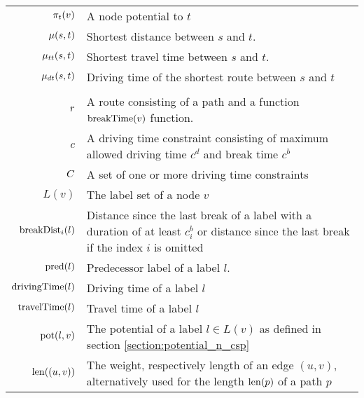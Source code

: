 \begin{tabular}{rp{}}
	$\pi_t(v)$         & A node potential to $t$                                                                                                                   \\
	$\mu(s,t)$          & Shortest distance between $s$ and $t$.                                                                                                    \\
	$\mu_{tt}(s,t)$        & Shortest travel time between $s$ and $t$.                                                                                                 \\
	$\mu_{dt}(s,t)$       & Driving time of the shortest route between $s$ and $t$                                                                                    \\
	\\
	$r$                  & A route consisting of a path and a function $\operatorname{breakTime}(v)$ function.                                                                     \\
	$c$                  & A driving time constraint consisting of maximum allowed driving time $c^d$ and break time $c^b$                                           \\
	$C$               & A set of one or more driving time constraints                                                                                             \\
	$L(v)$                    & The label set of a node $v$                                                                                                               \\
	$\operatorname{breakDist}_i(l)$         & Distance since the last break of a label with a duration of at least $c_i^b$ or distance since the last break if the index $i$ is omitted \\
	$\operatorname{pred}(l)$                & Predecessor label of a label $l$.                                                                                                         \\

	$\operatorname{drivingTime}(l)$          & Driving time of a label $l$                                                                                                               \\
	$\operatorname{travelTime}(l)$          & Travel time of a label $l$                                                                                                                \\
	$\operatorname{pot}(l,v)$ & The potential of a label $l \in L(v)$ as defined in section \ref{section:potential_n_csp}                                                 \\
	$\operatorname{len}((u,v))$             & The weight, respectively length of an edge $(u,v)$, alternatively used for the length $\operatorname{len}(p)$ of a path $p$                             \\
\end{tabular}



